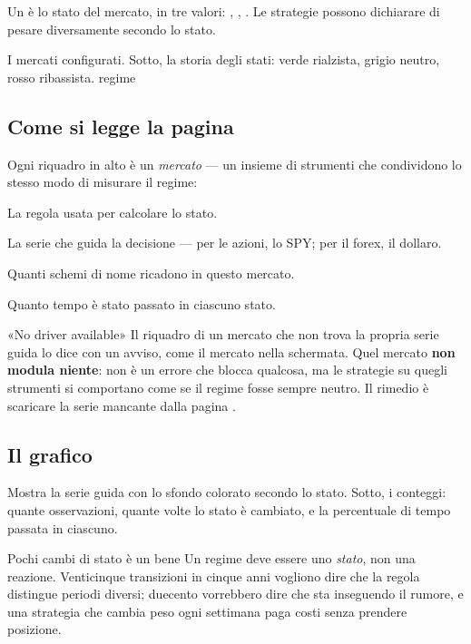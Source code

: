 Un  è lo stato del mercato, in tre valori: ,
, . Le strategie possono dichiarare di pesare
diversamente secondo lo stato.

  {I mercati configurati. Sotto, la storia degli stati: verde rialzista,
   grigio neutro, rosso ribassista.}
  {regime}

\subsection{Come si legge la pagina}

Ogni riquadro in alto è un \emph{mercato} --- un insieme di strumenti che
condividono lo stesso modo di misurare il regime:

\begin{description}[leftmargin = 1.4em, style = nextline, itemsep = 4pt]
  \item[\voce{RULE}] La regola usata per calcolare lo stato.
  \item[\voce{DRIVER}] La serie che guida la decisione --- per le azioni, lo
    SPY; per il forex, il dollaro.
  \item[\voce{SYMBOLS}] Quanti schemi di nome ricadono in questo mercato.
  \item[La barra colorata] Quanto tempo è stato passato in ciascuno stato.
\end{description}

\begin{attenzione}{«No driver available»}
Il riquadro di un mercato che non trova la propria serie guida lo dice con
un avviso, come il mercato  nella schermata. Quel mercato
\textbf{non modula niente}: non è un errore che blocca qualcosa, ma le
strategie su quegli strumenti si comportano come se il regime fosse sempre
neutro. Il rimedio è scaricare la serie mancante dalla pagina .
\end{attenzione}

\subsection{Il grafico}

Mostra la serie guida con lo sfondo colorato secondo lo stato. Sotto, i
conteggi: quante osservazioni, quante volte lo stato è cambiato, e la
percentuale di tempo passata in ciascuno.

\begin{nota}{Pochi cambi di stato è un bene}
Un regime deve essere uno \emph{stato}, non una reazione. Venticinque
transizioni in cinque anni vogliono dire che la regola distingue periodi
diversi; duecento vorrebbero dire che sta inseguendo il rumore, e una
strategia che cambia peso ogni settimana paga costi senza prendere
posizione.
\end{nota}
